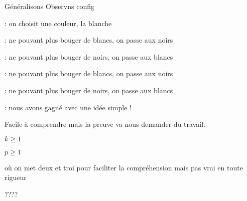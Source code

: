 Généralisons Observns config 

\begin{mvts}
    \medskip
    \item  {} : on choisit une couleur, la blanche

    \medskip
    \item  {} : ne pouvant plus bouger de blancs, on passe aux noirs

    \medskip
    \item  {}

    \medskip
    \item  {}

    \medskip
    \item  {} : ne pouvant plus bouger de noirs, on passe aux blancs

    \medskip
    \item  {}

    \medskip
    \item  {} : ne pouvant plus bouger de blancs, on passe aux noirs

    \medskip
    \item  {}

    \medskip
    \item  {} : ne pouvant plus bouger de noirs, on passe aux blancs

    \medskip
    \item  {}

    \medskip
    \item  {}

    \medskip
    \item  {} : nous avons gagné avec une idée simple !
\end{mvts}

Facile à comprendre mais la preuve va nous demander du travail.


\begin{fact}
    $k \geq 1$

    $p \geq 1$


     où on met deux \black{} et troi \white{} pour faciliter la compréhension mais pas vrai en toute rigueur

    ????
\end{fact}

